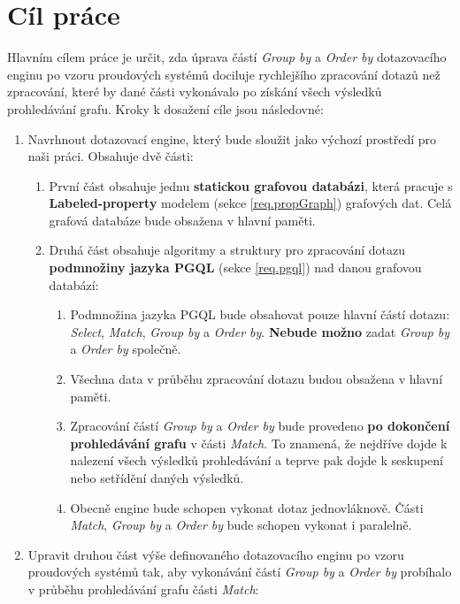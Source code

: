 \section*{Cíl práce}

Hlavním cílem práce je určit, zda úprava částí \textit{Group by} a \textit{Order by} dotazovacího enginu po vzoru proudových systémů dociluje rychlejšího zpracování dotazů než zpracování, které by dané části vykonávalo po získání všech výsledků prohledávání grafu.
Kroky k dosažení cíle jsou následovné:
\begin{enumerate}
\item
Navrhnout dotazovací engine, který bude sloužit jako výchozí prostředí pro naši práci.
Obsahuje dvě části:
\begin{enumerate}
\item První část obsahuje jednu \textbf{statickou grafovou databázi}, která pracuje s \textbf{Labeled-property} modelem (sekce \ref{req.propGraph}) grafových dat.
Celá grafová databáze bude obsažena v hlavní paměti.

\item Druhá část obsahuje algoritmy a struktury pro zpracování dotazu \textbf{podmnožiny jazyka PGQL} (sekce \ref{req.pgql}) nad danou grafovou databází:
    \begin{enumerate}
    \item Podmnožina jazyka PGQL bude obsahovat pouze hlavní částí dotazu: \textit{Select}, \textit{Match}, \textit{Group by} a \textit{Order by}.
    \textbf{Nebude možno} zadat \textit{Group by} a \textit{Order by} společně.
    \item Všechna data v průběhu zpracování dotazu budou obsažena v hlavní paměti.
    \item Zpracování částí \textit{Group by} a \textit{Order by} bude provedeno \textbf{po dokončení prohledávání grafu} v části \textit{Match}.
    To znamená, že nejdříve dojde k nalezení všech výsledků prohledávání a teprve pak dojde k seskupení nebo setřídění daných výsledků.
    \item Obecně engine bude schopen vykonat dotaz jednovláknově.
    Části \textit{Match}, \textit{Group by} a \textit{Order by} bude schopen vykonat i paralelně.
    \end{enumerate}
\end{enumerate}

\item
Upravit druhou část výše definovaného dotazovacího enginu po vzoru proudových systémů tak, aby vykonávání částí \textit{Group by} a \textit{Order by} probíhalo v průběhu prohledávání grafu části \textit{Match}:
\begin{enumerate}


\end{enumerate}
\end{enumerate}
